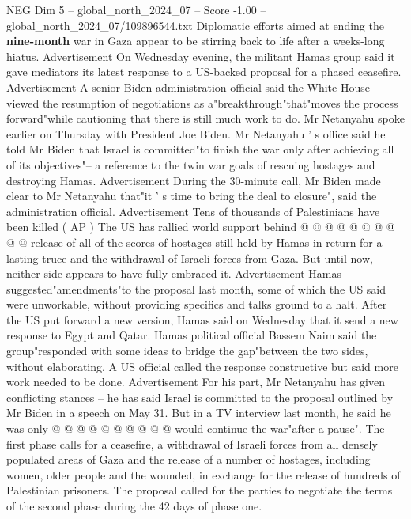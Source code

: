 \begin{textsample}{NEG Dim 5 – global\_north\_2024\_07 – Score -1.00 – global\_north\_2024\_07/109896544.txt}  \label{ex:f5_neg_144}
Diplomatic efforts aimed at ending the \textbf{nine-month} war in Gaza appear to be stirring back to life after a weeks-long hiatus.
Advertisement On Wednesday evening, the militant Hamas group said it gave mediators its latest response to a US-backed proposal for a phased ceasefire.
Advertisement A senior Biden administration official said the White House viewed the resumption of negotiations as a"breakthrough"that"moves the process forward"while cautioning that there is still much work to do.
Mr Netanyahu spoke earlier on Thursday with President Joe Biden.
Mr Netanyahu ' s office said he told Mr Biden that Israel is committed"to finish the war only after achieving all of its objectives"-- a reference to the twin war goals of rescuing hostages and destroying Hamas.
Advertisement During the 30-minute call, Mr Biden made clear to Mr Netanyahu that"it ' s time to bring the deal to closure", said the administration official.
Advertisement Tens of thousands of Palestinians have been killed ( AP ) The US has rallied world support behind @ @ @ @ @ @ @ @ @ @ release of all of the scores of hostages still held by Hamas in return for a lasting truce and the withdrawal of Israeli forces from Gaza.
But until now, neither side appears to have fully embraced it.
Advertisement Hamas suggested"amendments"to the proposal last month, some of which the US said were unworkable, without providing specifics and talks ground to a halt.
After the US put forward a new version, Hamas said on Wednesday that it send a new response to Egypt and Qatar.
Hamas political official Bassem Naim said the group"responded with some ideas to bridge the gap"between the two sides, without elaborating.
A US official called the response constructive but said more work needed to be done.
Advertisement For his part, Mr Netanyahu has given conflicting stances -- he has said Israel is committed to the proposal outlined by Mr Biden in a speech on May 31.
But in a TV interview last month, he said he was only @ @ @ @ @ @ @ @ @ @ would continue the war"after a pause".
The first phase calls for a ceasefire, a withdrawal of Israeli forces from all densely populated areas of Gaza and the release of a number of hostages, including women, older people and the wounded, in exchange for the release of hundreds of Palestinian prisoners.
The proposal called for the parties to negotiate the terms of the second phase during the 42 days of phase one.

\end{textsample}
